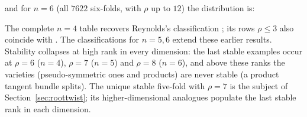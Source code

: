 \documentclass[11pt]{amsart}
\theoremstyle{definition}
\theoremstyle{remark}
\begin{document}
\begin{center}
\end{center}

\noindent and for $n = 6$ (all $7622$ six-folds, with $\rho$ up to $12$)
the distribution is:

\begin{center}
\end{center}

\noindent The complete $n=4$ table recovers Reynolds's classification
\cite[Appendix~A]{Reynolds2023}; its rows $\rho\le3$ also coincide with
\cite{BDGP2021,DDK}. The classifications for $n=5,6$ extend these
earlier results. Stability collapses at high rank in every
dimension: the last stable examples occur at $\rho = 6$ ($n=4$),
$\rho = 7$ ($n=5$) and $\rho = 8$ ($n=6$), and above these ranks the
varieties (pseudo-symmetric ones and products) are never stable (a
product tangent bundle splits). The unique stable five-fold with
$\rho = 7$ is the subject of Section~\ref{sec:roottwist}; its
higher-dimensional analogues populate the last stable rank in each
dimension.
\end{document}
